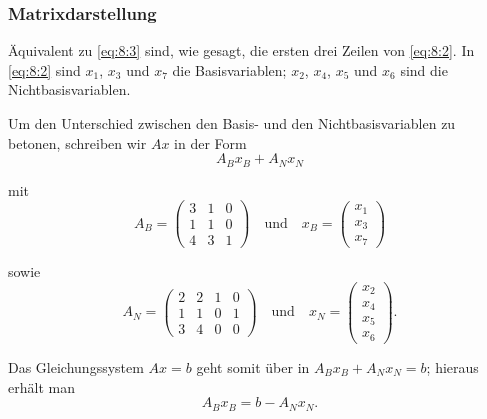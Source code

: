 \documentclass[smaller]{beamer}
\begin{document}
\begin{frame}
 \frametitle{Matrixdarstellung}
 Äquivalent zu \eqref{eq:8:3} sind, wie gesagt, die ersten drei Zeilen von \eqref{eq:8:2}. In \eqref{eq:8:2} sind $x_1$, $x_3$ und $x_7$ die Basisvariablen; $x_2$, $x_4$, $x_5$ und $x_6$ sind die Nichtbasisvariablen. \\ \vspace*{0.2cm}

Um den Unterschied zwischen den Basis- und den Nichtbasisvariablen zu betonen, schreiben wir $Ax$ in der Form
\[
A_Bx_B + A_Nx_N
\]

mit
\[
A_B = \begin{pmatrix} 3 & 1 & 0 \\ 1 & 1 & 0 \\ 4 & 3 & 1 \end{pmatrix}  \quad \text{und} \quad
x_B = \begin{pmatrix} x_1 \\ x_3 \\ x_7 \end{pmatrix}
\]

sowie
\[
A_N = \begin{pmatrix} 2 & 2 & 1 & 0 \\ 1 & 1 & 0 & 1\\ 3 & 4 & 0 & 0 \end{pmatrix}  \quad \text{und} \quad
x_N = \begin{pmatrix} x_2 \\ x_4 \\ x_5 \\ x_6 \end{pmatrix}.
\]

Das Gleichungssystem $Ax=b$ geht somit über in $A_Bx_B + A_Nx_N = b$; hieraus erhält man
\begin{equation}
\label{eq:8:4}
A_Bx_B = b - A_Nx_N.
\end{equation}
\end{frame}
\end{document}
